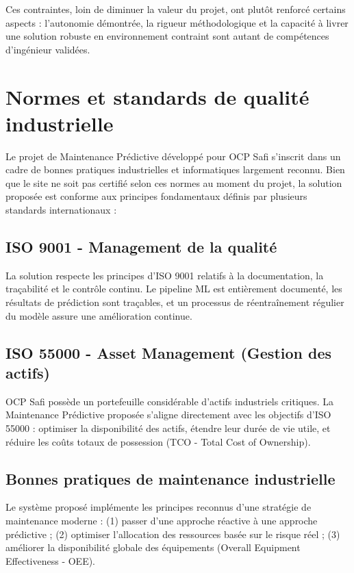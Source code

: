 \documentclass[a4paper,12pt,twoside]{report}
\begin{document}
Ces contraintes, loin de diminuer la valeur du projet, ont plutôt renforcé certains aspects : l'autonomie démontrée, la rigueur méthodologique et la capacité à livrer une solution robuste en environnement contraint sont autant de compétences d'ingénieur validées.

\section{Normes et standards de qualité industrielle}

Le projet de Maintenance Prédictive développé pour OCP Safi s'inscrit dans un cadre de bonnes pratiques industrielles et informatiques largement reconnu. Bien que le site ne soit pas certifié selon ces normes au moment du projet, la solution proposée est conforme aux principes fondamentaux définis par plusieurs standards internationaux :

\subsection{ISO 9001 - Management de la qualité}

La solution respecte les principes d'ISO 9001 relatifs à la documentation, la traçabilité et le contrôle continu. Le pipeline ML est entièrement documenté, les résultats de prédiction sont traçables, et un processus de réentraînement régulier du modèle assure une amélioration continue.

\subsection{ISO 55000 - Asset Management (Gestion des actifs)}

OCP Safi possède un portefeuille considérable d'actifs industriels critiques. La Maintenance Prédictive proposée s'aligne directement avec les objectifs d'ISO 55000 : optimiser la disponibilité des actifs, étendre leur durée de vie utile, et réduire les coûts totaux de possession (TCO - Total Cost of Ownership).

\subsection{Bonnes pratiques de maintenance industrielle}

Le système proposé implémente les principes reconnus d'une stratégie de maintenance moderne : (1) passer d'une approche réactive à une approche prédictive ; (2) optimiser l'allocation des ressources basée sur le risque réel ; (3) améliorer la disponibilité globale des équipements (Overall Equipment Effectiveness - OEE).
\end{document}
